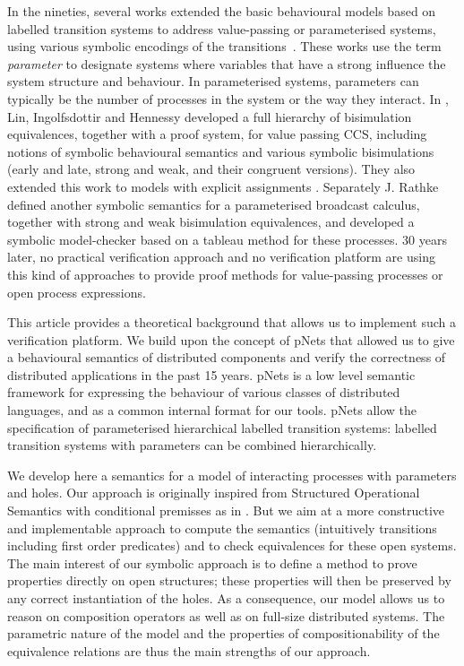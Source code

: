 \documentclass{elsarticle}
\begin{document}
In the nineties, several 
works extended the basic behavioural models based on labelled
transition systems to address value-passing or parameterised systems, using
various symbolic encodings of the
transitions~\cite{deSimone85,Larsen87}. 
These works use the term \emph{parameter} to designate systems where variables that have a strong influence the system structure and behaviour. In parameterised systems, parameters can typically be the number of processes in the system or the way they interact.
In \cite{IngolfsdottirL:2001,HennessyLin:TCS95}, Lin, Ingolfsdottir and Hennessy developed a full hierarchy of
bisimulation equivalences, together with a proof system, for value passing CCS,
including notions of symbolic behavioural semantics and various symbolic 
bisimulations (early and late, strong and weak, and their congruent versions). They also extended this work to models with explicit assignments \cite{Linconcur96}.
Separately J. Rathke~\cite{HennessyRathke:TCS98} defined another symbolic semantics for 
a parameterised broadcast calculus, together with strong and weak bisimulation
equivalences, and developed a symbolic model-checker based on a tableau
method for these processes. 30 years later, no
practical verification approach and no verification platform are
using this kind of approaches to provide proof methods for
value-passing processes or open process expressions. 


This article provides a theoretical background that allows us to implement such a verification 
platform. We build upon the concept of pNets that allowed us to give a behavioural semantics 
of distributed components and verify the correctness of distributed applications in the past 15 years. pNets  is a
low level semantic framework for expressing the behaviour of various
classes of distributed languages, and as a common internal format for
our tools.  pNets allow the
specification of parameterised hierarchical labelled
transition systems:  labelled transition systems with parameters can be
combined hierarchically.


We develop here a semantics for a model of interacting processes with parameters and holes. 
Our approach is originally inspired from Structured Operational Semantics with conditional premisses as in \cite{GROOTE1993263,VANGLABBEEK2004229}.
But we aim at a more constructive and implementable approach to compute the semantics (intuitively transitions including first order predicates) and to 
check equivalences for these open systems.
The main interest of our symbolic approach is to define a method to
prove properties directly on open structures; these properties will then be preserved
by any correct instantiation of the holes.
As a consequence, our model allows us to reason on composition
operators as well as on full-size distributed systems. The parametric
nature of the model and the properties of compositionability of the
equivalence relations are thus  the main
strengths of  our approach. 
\end{document}
